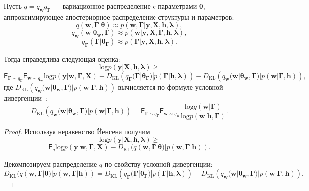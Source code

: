 \begin{theorem}
Пусть $q = q_{\mathbf{w}}q_{\boldsymbol{\Gamma}}$ --- вариационное распределение c параметрами $\boldsymbol{\theta}$, аппроксимирующее апостериорное распределение структуры и параметров:
\[
    q (\mathbf{w},\boldsymbol{\Gamma}|\boldsymbol{\theta}) \approx p(\mathbf{w},\boldsymbol{\Gamma}|\mathbf{y}, \mathbf{X}, \mathbf{h}, \boldsymbol{\lambda}),
\]
\[
    q_{\mathbf{w}}(\mathbf{w}|\boldsymbol{\theta}_\mathbf{w},\boldsymbol{\Gamma}) \approx p(\mathbf{w}|\mathbf{y}, \mathbf{X},  \boldsymbol{\Gamma},\mathbf{h}, \boldsymbol{\lambda}),
\]
\[
    q_{\boldsymbol{\Gamma}}(\boldsymbol{\Gamma}|\boldsymbol{\theta}_{\boldsymbol{\Gamma}}) \approx p(\boldsymbol{\Gamma}|\mathbf{y}, \mathbf{X},  \mathbf{h}, \boldsymbol{\lambda}).
\]

Тогда справедлива следующая оценка:
\begin{equation}
\label{eq:full_elbo}
\text{log} p(\mathbf{y}|\mathbf{X}, \mathbf{h}, \boldsymbol{\lambda}) \geq
\end{equation}
\[
 \mathsf{E}_{\boldsymbol{\Gamma} \sim q_{\boldsymbol{\Gamma}}}\mathsf{E}_{\mathbf{w} \sim q_{\mathbf{w}}} \text{log}p(\mathbf{y}|\mathbf{w}, \boldsymbol{\Gamma}, \mathbf{X}) - D_\text{KL}\left(q_{\boldsymbol{\Gamma}}(\boldsymbol{\Gamma}|\boldsymbol{\theta}_{\boldsymbol{\Gamma}})|p(\boldsymbol{\Gamma}|\mathbf{h}, \boldsymbol{\lambda})\right) - D_\text{KL}\left(q_{\mathbf{w}}(\mathbf{w}|\boldsymbol{\theta}_\mathbf{w},\boldsymbol{\Gamma})|p(\mathbf{w}|\boldsymbol{\Gamma}, \mathbf{h})\right),
\]
где $D_\text{KL}\left(q_{\mathbf{w}}(\mathbf{w}|\boldsymbol{\theta}_\mathbf{w},\boldsymbol{\Gamma})|p(\mathbf{w}|\boldsymbol{\Gamma}, \mathbf{h})\right)$ вычисляется по формуле условной дивергенции~\cite{TODO}:
\[
D_\text{KL}\left(q_{\mathbf{w}}(\mathbf{w}|\boldsymbol{\theta}_\mathbf{w},\boldsymbol{\Gamma})|p(\mathbf{w}|\boldsymbol{\Gamma}, \mathbf{h})\right) = \mathsf{E}_{\boldsymbol{\Gamma} \sim q_{\boldsymbol{\Gamma}}} \mathsf{E}_{\mathbf{w} \sim q_{\mathbf{w}}} \frac{\text{log}q(\mathbf{w}|\boldsymbol{\Gamma})}{\text{log}p(\mathbf{w}|\mathbf{h},\boldsymbol{\Gamma})}.
\]
\end{theorem}

\begin{proof}
Используя неравенство Йенсена получим 
\[
\text{log} p(\mathbf{y}|\mathbf{X}, \mathbf{h}, \boldsymbol{\lambda}) \geq
\]
\[
   \mathsf{E}_{q} \text{log}p(\mathbf{y}|\mathbf{w}, \boldsymbol{\Gamma}, \mathbf{X}) - D_\text{KL}(q (\mathbf{w},\boldsymbol{\Gamma}|\boldsymbol{\theta})|p(\mathbf{w},\boldsymbol{\Gamma}|\mathbf{h})).
\]

Декомпозируем распределение $q$ по свойству условной дивергенции:
\[
D_\text{KL}(q (\mathbf{w},\boldsymbol{\Gamma}|\boldsymbol{\theta})|p(\mathbf{w},\boldsymbol{\Gamma}|\mathbf{h})) = D_\text{KL}\left(q_{\boldsymbol{\Gamma}}(\boldsymbol{\Gamma}|\boldsymbol{\theta}_{\boldsymbol{\Gamma}})|p(\boldsymbol{\Gamma}|\mathbf{h}, \boldsymbol{\lambda})\right) + D_\text{KL}\left(q_{\mathbf{w}}(\mathbf{w}|\boldsymbol{\theta}_\mathbf{w},\boldsymbol{\Gamma})|p(\mathbf{w}|\boldsymbol{\Gamma}, \mathbf{h})\right).    
\]
\end{proof}

